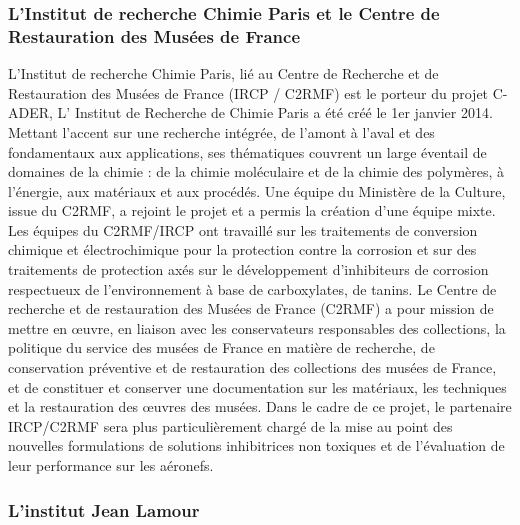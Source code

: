 \subsubsection{L'Institut de recherche Chimie Paris et le Centre de Restauration des Musées de France}

L’Institut de recherche Chimie Paris, lié au Centre de Recherche et de Restauration des Musées de France (IRCP / C2RMF) est le porteur du projet C-ADER, L’ Institut de Recherche de Chimie Paris a été créé le 1er janvier 2014. Mettant l'accent sur une recherche intégrée, de l'amont à l'aval et des fondamentaux aux applications, ses thématiques couvrent un large éventail de domaines de la chimie : de la chimie moléculaire et de la chimie des polymères, à l'énergie, aux matériaux et aux procédés. Une équipe du Ministère de la Culture, issue du C2RMF, a rejoint le projet et a permis la création d'une équipe mixte. Les équipes du C2RMF/IRCP ont travaillé sur les traitements de conversion chimique et électrochimique pour la protection contre la corrosion et sur des traitements de protection axés sur le développement d'inhibiteurs de corrosion respectueux de l'environnement à base de carboxylates, de tanins. Le Centre de recherche et de restauration des Musées de France (C2RMF) a pour mission de mettre en œuvre, en liaison avec les conservateurs responsables des collections, la politique du service des musées de France en matière de recherche, de conservation préventive et de restauration des collections des musées de France, et de constituer et conserver une documentation sur les matériaux, les techniques et la restauration des œuvres des musées. Dans le cadre de ce projet, le partenaire IRCP/C2RMF sera plus particulièrement chargé de la mise au point des nouvelles formulations de solutions inhibitrices non toxiques et de l’évaluation de leur performance sur les aéronefs.

\subsubsection{L'institut Jean Lamour}

